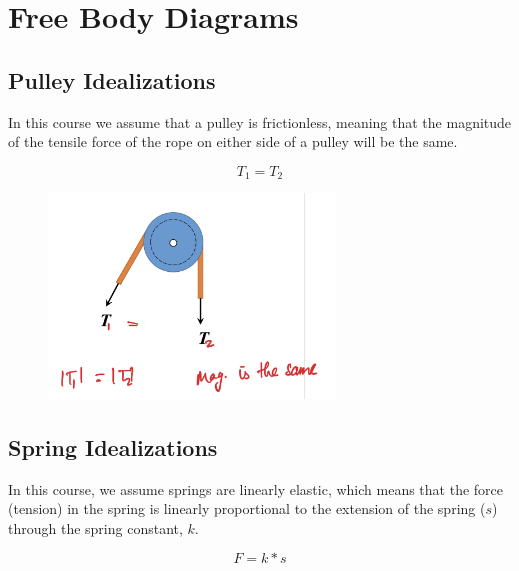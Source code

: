 \section{Free Body Diagrams}


\subsection{Pulley Idealizations}

In this course we assume that a pulley is frictionless, meaning that the magnitude of the tensile force of the rope on either side of a pulley will be the same. 

\[{T_1} = {T_2}\]

\begin{figure}[!h]
\centering
\includegraphics[angle=0, width=3in]{FBDFigures/PulleyAssumptions.png}
\vspace{-2mm}
\caption{\small {}}
\vspace{-3mm}
\label{Fig:PulleyAsusmptions}
\end{figure}

\subsection{Spring Idealizations}

In this course, we assume springs are linearly elastic, which means that the force (tension) in the spring is linearly proportional to the extension of the spring ($s$) through the spring constant, $k$.

\[{F} = {k*s}\]

